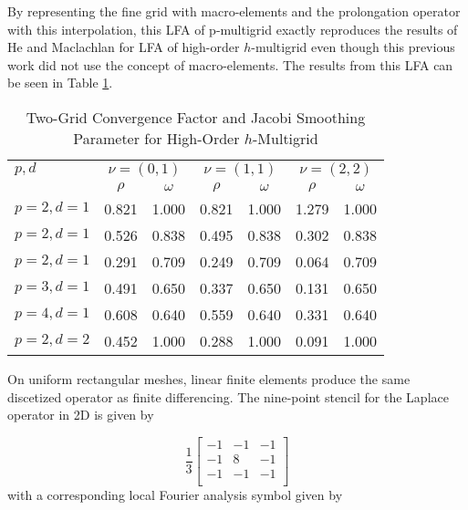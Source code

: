 By representing the fine grid with macro-elements and the prolongation operator with this interpolation, this LFA of p-multigrid exactly reproduces the results of He and Maclachlan \cite{he2020two} for LFA of high-order $h$-multigrid even though this previous work did not use the concept of macro-elements.
The results from this LFA can be seen in Table \ref{table:two_grid_hmultigrid}.

\begin{table}[ht!]
\begin{center}
\begin{tabular}{l cc cc cc}
  \toprule
  $p, d$  &  \multicolumn{2}{c}{$\nu = \left( 0, 1 \right)$}  &  \multicolumn{2}{c}{$\nu = \left( 1, 1 \right)$}  &  \multicolumn{2}{c}{$\nu = \left( 2, 2 \right)$}  \\
                      &  $\rho$  &  $\omega$  &  $\rho$ & $\omega$  &  $\rho$ & $\omega$  \\
  \toprule
  $p = 2, d = 1$  &  0.821 & 1.000  &  0.821 & 1.000  &  1.279 & 1.000   \\
  $p = 2, d = 1$  &  0.526 & 0.838  &  0.495 & 0.838  &  0.302 & 0.838   \\
  $p = 2, d = 1$  &  0.291 & 0.709  &  0.249 & 0.709  &  0.064 & 0.709   \\
  \midrule
  $p = 3, d = 1$  &  0.491 & 0.650  &  0.337 & 0.650  &  0.131 & 0.650   \\
  \midrule
  $p = 4, d = 1$  &  0.608 & 0.640  &  0.559 & 0.640  &  0.331 & 0.640   \\
  \midrule
  $p = 2, d = 2$  &  0.452 & 1.000  &  0.288 & 1.000  &  0.091 & 1.000   \\
  \bottomrule
\end{tabular}
\end{center}
\caption{Two-Grid Convergence Factor and Jacobi Smoothing Parameter for High-Order $h$-Multigrid}
\label{table:two_grid_hmultigrid}
\end{table}

On uniform rectangular meshes, linear finite elements produce the same discetized operator as finite differencing.
The nine-point stencil for the Laplace operator in 2D is given by

\begin{equation}
\frac{1}{3}
\begin{bmatrix}
-1  &  -1  &  -1   \\
-1  &   8  &  -1   \\
-1  &  -1  &  -1  \\
\end{bmatrix}
\end{equation}
with a corresponding local Fourier analysis symbol given by


